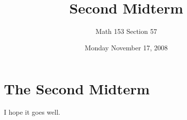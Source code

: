 \documentclass[12pt]{article}
\title{Second Midterm}
\author{Math 153 Section 57}
\date{Monday November 17, 2008}
\begin{document}
\maketitle

\section{The Second Midterm}

I hope it goes well.
\end{document}
